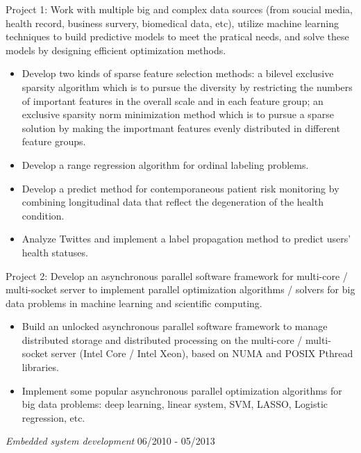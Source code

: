 \documentclass[11pt]{res} %
\begin{document}
\begin{resume}
Project 1: Work with multiple big and complex data sources (from soucial media, health record, business survery, biomedical data, etc), utilize machine learning techniques to build predictive models to meet the pratical needs, and solve these models by designing efficient optimization methods.
\begin{itemize} \itemsep -2pt %
\item Develop two kinds of sparse feature selection methods: a bilevel exclusive sparsity algorithm which is to pursue the diversity by restricting the numbers of important features in the overall scale and in each feature group; an exclusive sparsity norm minimization method which is to pursue a sparse solution by making the importmant features evenly distributed in different feature groups.
\item Develop a range regression algorithm for ordinal labeling problems.
\item Develop a predict method for contemporaneous patient risk monitoring by combining longitudinal data that reflect the degeneration of the health condition.
\item Analyze Twittes and implement a label propagation method to predict users' health statuses.
\end{itemize} 



\vspace{-8pt} %

Project 2: Develop an asynchronous parallel software framework for multi-core / multi-socket server to implement parallel optimization algorithms / solvers for big data problems in machine learning and scientific computing.
\begin{itemize} \itemsep -2pt %
\item Build an unlocked asynchronous parallel software framework to manage distributed storage and distributed processing on the multi-core / multi-socket server (Intel Core / Intel Xeon), based on NUMA and POSIX Pthread libraries. 
\item Implement some popular asynchronous parallel optimization algorithms for big data problems: deep learning, linear system, SVM, LASSO, Logistic regression, etc. 
\end{itemize}



{\sl Embedded system development}  \hfill 06/2010 - 05/2013 %


\end{resume}
\end{document}
